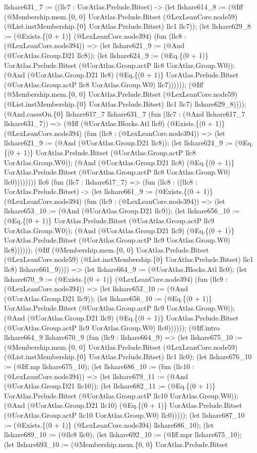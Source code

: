 \documentclass[11pt]{article}
\begin{document}
llshare631\_7 := ((llc7 : UorAtlas.Prelude.Bitset) -> (let llshare614\_8 := (@Iff (@Membership.mem.\{0, 0\} UorAtlas.Prelude.Bitset (@LexLeanCore.node59) (@List.instMembership.\{0\} UorAtlas.Prelude.Bitset) llc1 llc7)); (let llshare629\_8 := (@Exists.\{(0 + 1)\} (@LexLeanCore.node394) (fun (llc8 : (@LexLeanCore.node394)) => (let llshare621\_9 := (@And (@UorAtlas.Group.D21 llc8)); (let llshare624\_9 := (@Eq.\{(0 + 1)\} UorAtlas.Prelude.Bitset (@UorAtlas.Group.actP llc8 UorAtlas.Group.W0)); (@And (@UorAtlas.Group.D21 llc8) (@Eq.\{(0 + 1)\} UorAtlas.Prelude.Bitset (@UorAtlas.Group.actP llc8 UorAtlas.Group.W0) llc7)))))); (@Iff (@Membership.mem.\{0, 0\} UorAtlas.Prelude.Bitset (@LexLeanCore.node59) (@List.instMembership.\{0\} UorAtlas.Prelude.Bitset) llc1 llc7) llshare629\_8)))); (@And.casesOn.\{0\} llshare617\_7 llshare631\_7 (fun (llc7 : (@And llshare617\_7 llshare631\_7)) => (@Iff (@UorAtlas.Blocks.Atl llc0) (@Exists.\{(0 + 1)\} (@LexLeanCore.node394) (fun (llc8 : (@LexLeanCore.node394)) => (let llshare621\_9 := (@And (@UorAtlas.Group.D21 llc8)); (let llshare624\_9 := (@Eq.\{(0 + 1)\} UorAtlas.Prelude.Bitset (@UorAtlas.Group.actP llc8 UorAtlas.Group.W0)); (@And (@UorAtlas.Group.D21 llc8) (@Eq.\{(0 + 1)\} UorAtlas.Prelude.Bitset (@UorAtlas.Group.actP llc8 UorAtlas.Group.W0) llc0)))))))) llc6 (fun (llc7 : llshare617\_7) => (fun (llc8 : ((llc8 : UorAtlas.Prelude.Bitset) -> (let llshare661\_9 := (@Exists.\{(0 + 1)\} (@LexLeanCore.node394) (fun (llc9 : (@LexLeanCore.node394)) => (let llshare653\_10 := (@And (@UorAtlas.Group.D21 llc9)); (let llshare656\_10 := (@Eq.\{(0 + 1)\} UorAtlas.Prelude.Bitset (@UorAtlas.Group.actP llc9 UorAtlas.Group.W0)); (@And (@UorAtlas.Group.D21 llc9) (@Eq.\{(0 + 1)\} UorAtlas.Prelude.Bitset (@UorAtlas.Group.actP llc9 UorAtlas.Group.W0) llc8)))))); (@Iff (@Membership.mem.\{0, 0\} UorAtlas.Prelude.Bitset (@LexLeanCore.node59) (@List.instMembership.\{0\} UorAtlas.Prelude.Bitset) llc1 llc8) llshare661\_9)))) => (let llshare664\_9 := (@UorAtlas.Blocks.Atl llc0); (let llshare670\_9 := (@Exists.\{(0 + 1)\} (@LexLeanCore.node394) (fun (llc9 : (@LexLeanCore.node394)) => (let llshare653\_10 := (@And (@UorAtlas.Group.D21 llc9)); (let llshare656\_10 := (@Eq.\{(0 + 1)\} UorAtlas.Prelude.Bitset (@UorAtlas.Group.actP llc9 UorAtlas.Group.W0)); (@And (@UorAtlas.Group.D21 llc9) (@Eq.\{(0 + 1)\} UorAtlas.Prelude.Bitset (@UorAtlas.Group.actP llc9 UorAtlas.Group.W0) llc0)))))); (@Iff.intro llshare664\_9 llshare670\_9 (fun (llc9 : llshare664\_9) => (let llshare675\_10 := (@Membership.mem.\{0, 0\} UorAtlas.Prelude.Bitset (@LexLeanCore.node59) (@List.instMembership.\{0\} UorAtlas.Prelude.Bitset) llc1 llc0); (let llshare676\_10 := (@Iff.mp llshare675\_10); (let llshare686\_10 := (fun (llc10 : (@LexLeanCore.node394)) => (let llshare679\_11 := (@And (@UorAtlas.Group.D21 llc10)); (let llshare682\_11 := (@Eq.\{(0 + 1)\} UorAtlas.Prelude.Bitset (@UorAtlas.Group.actP llc10 UorAtlas.Group.W0)); (@And (@UorAtlas.Group.D21 llc10) (@Eq.\{(0 + 1)\} UorAtlas.Prelude.Bitset (@UorAtlas.Group.actP llc10 UorAtlas.Group.W0) llc0))))); (let llshare687\_10 := (@Exists.\{(0 + 1)\} (@LexLeanCore.node394) llshare686\_10); (let llshare689\_10 := (@llc8 llc0); (let llshare692\_10 := (@Iff.mpr llshare675\_10); (let llshare693\_10 := (@Membership.mem.\{0, 0\} UorAtlas.Prelude.Bitset 
\end{document}
